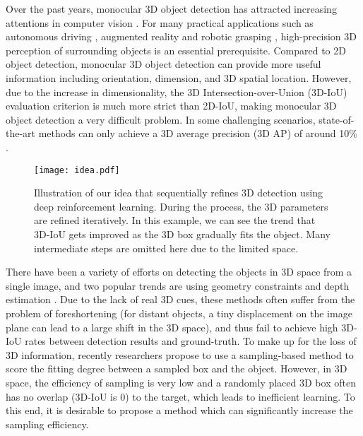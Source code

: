 \documentclass[runningheads]{llncs}
\begin{document}
Over the past years, monocular 3D object detection has attracted increasing attentions in computer vision \cite{chabot2017deep,ku2019monocular,chang2019deep,roddick2018orthographic,simonelli2019disentangling}. For many practical applications such as autonomous driving \cite{bertozzi2000vision,geiger2012we,geiger2013vision,chen2015deepdriving,janai2017computer}, augmented reality \cite{alhaija2018augmented,rematas2018soccer} and robotic grasping \cite{saxena2008robotic,mahler2017dex,levine2018learning}, high-precision 3D perception of surrounding objects is an essential prerequisite. Compared to 2D object detection, monocular 3D object detection can provide more useful information including orientation, dimension, and 3D spatial location. However, due to the increase in dimensionality, the 3D Intersection-over-Union (3D-IoU) evaluation criterion is much more strict than 2D-IoU, making monocular 3D object detection a very difficult problem. In some challenging scenarios, state-of-the-art methods can only achieve a 3D average precision (3D AP) of around 10\% \cite{brazil2019m3d,ma2019accurate}.

\begin{figure}[t]
    \begin{center}
       \texttt{[image: idea.pdf]}
    \end{center}
   \caption{Illustration of our idea that sequentially refines 3D detection using deep reinforcement learning. During the process, the 3D parameters are refined iteratively. In this example, we can see the trend that 3D-IoU gets improved as the 3D box gradually fits the object. Many intermediate steps are omitted here due to the limited space.}
\label{fig:idea}
\end{figure}

There have been a variety of efforts on detecting the objects in 3D space from a single image, and two popular trends are using geometry constraints \cite{mousavian20173d,kundu20183d,li2019gs3d} and depth estimation \cite{xu2018multi,qin2019monogrnet,manhardt2019roi,wang2019pseudo}. Due to the lack of real 3D cues, these methods often suffer from the problem of foreshortening (for distant objects, a tiny displacement on the image plane can lead to a large shift in the 3D space), and thus fail to achieve high 3D-IoU rates between detection results and ground-truth. To make up for the loss of 3D information, recently researchers propose to use a sampling-based method \cite{liu2019deep} to score the fitting degree between a sampled box and the object. However, in 3D space, the efficiency of sampling is very low and a randomly placed 3D box often has no overlap (3D-IoU is 0) to the target, which leads to inefficient learning. To this end, it is desirable to propose a method which can significantly increase the sampling efficiency.
\end{document}

